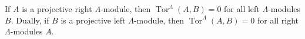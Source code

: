 If $A$ is a projective right $\Lambda$-module, then $\operatorname{Tor}^\Lambda(A, B) = 0$ for all left $\Lambda$-modules $B$. Dually, if $B$ is a projective left $\Lambda$-module, then $\operatorname{Tor}^\Lambda(A, B) = 0$ for all right $\Lambda$-modules $A$.

